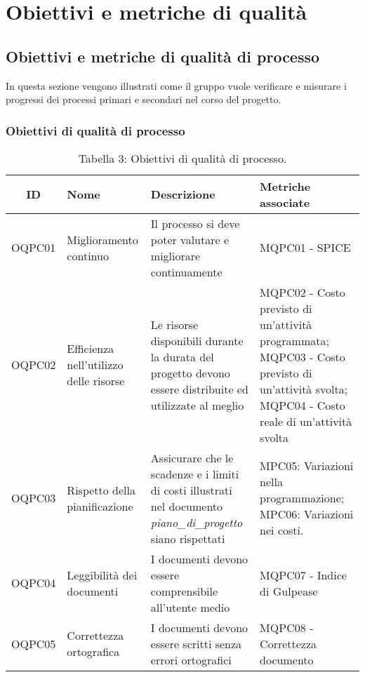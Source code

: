 \section{Obiettivi e metriche di qualità}
\subsection{Obiettivi e metriche di qualità di processo}
In questa sezione vengono illustrati come il gruppo vuole verificare e misurare i progressi dei processi primari e secondari nel corso del progetto.
\subsubsection{Obiettivi di qualità di processo}
\begin{table}[H]
	\centering
	\begin{tabularx}{\textwidth}{|c|X|X|X|}
	\hline
	\textbf{ID} & \textbf{Nome} & \textbf{Descrizione} & \textbf{Metriche associate}\\
	\hline
	OQPC01 & Miglioramento continuo & Il processo si deve poter valutare e migliorare continuamente & MQPC01 - SPICE\\
	\hline
	OQPC02 & Efficienza nell'utilizzo delle risorse & Le risorse disponibili durante la durata del progetto devono essere distribuite ed utilizzate al meglio & MQPC02 - Costo previsto di un'attività programmata; \hspace{25pt} MQPC03 - Costo previsto di un'attività svolta; MQPC04 - Costo reale di un'attività svolta \\
	\hline
	OQPC03 & Rispetto della pianificazione & Assicurare che le scadenze e i limiti di costi illustrati nel documento \textit{piano\_di\_progetto} siano rispettati &  MPC05: Variazioni nella programmazione;\hspace{65pt} MPC06: Variazioni nei costi. \\
	\hline
	OQPC04 & Leggibilità dei documenti & I documenti devono essere comprensibile all'utente medio & MQPC07 - Indice di Gulpease\\
	\hline
	OQPC05 & Correttezza ortografica & I documenti devono essere scritti senza errori ortografici & MQPC08 - Correttezza documento \\
	\hline
	\end{tabularx}
	\caption{Tabella 3: Obiettivi di qualità di processo.}
\end{table}
